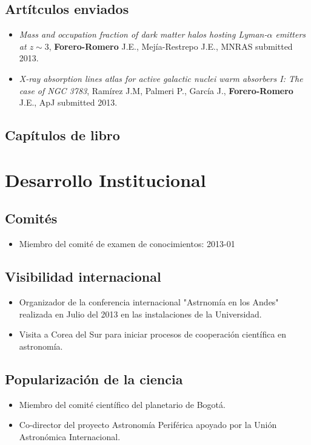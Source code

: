 \documentclass{article}
\begin{document}
\subsection*{Art\'itculos enviados}

\begin{itemize}
\item {\it Mass and occupation fraction of dark matter halos hosting Lyman-$\alpha$
  emitters at $z\sim 3$}, {\bf Forero-Romero} J.E., Mej\'ia-Restrepo
  J.E., MNRAS submitted 2013.
\item {\it X-ray absorption lines atlas for active galactic nuclei
  warm absorbers I: The case of NGC 3783}, Ram\'irez  J.M, Palmeri P.,
  Garc\'ia J., {\bf Forero-Romero} J.E., ApJ submitted 2013.
\end{itemize}

\subsection*{Cap\'itulos de libro}


\section*{Desarrollo Institucional}

\subsection*{Comit\'es}


\begin{itemize}
\item {Miembro del comit\'e de examen de conocimientos}: 2013-01
\end{itemize}

\subsection*{Visibilidad internacional}

\begin{itemize}
\item {Organizador de la conferencia internacional "Astrnom\'ia en los
  Andes" realizada en Julio del 2013 en las instalaciones de la Universidad.}
\item {Visita a Corea del Sur para iniciar procesos de cooperaci\'on
  cient\'ifica en astronom\'ia.}
\end{itemize}

\subsection*{Popularizaci\'on de la ciencia}
\begin{itemize}
\item {Miembro del comit\'e cient\'ifico del planetario de Bogot\'a.}
\item {Co-director del proyecto Astronom\'ia Perif\'erica apoyado por
  la Uni\'on Astron\'omica Internacional.}
\end{itemize}
\end{document}
